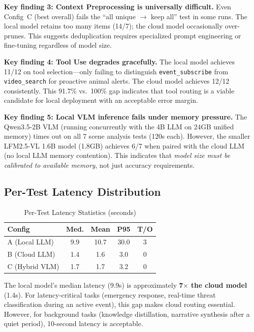 \documentclass[conference]{IEEEtran}
\begin{document}
\textbf{Key finding 3: Context Preprocessing is universally
difficult.} Even Config~C (best overall) fails the ``all unique
$\rightarrow$ keep all'' test in some runs. The local model retains too
many items (14/7); the cloud model occasionally over-prunes. This
suggests deduplication requires specialized prompt engineering or
fine-tuning regardless of model size.

\textbf{Key finding 4: Tool Use degrades gracefully.}
The local model achieves 11/12 on tool selection---only failing to
distinguish \texttt{event\_subscribe} from \texttt{video\_search} for
proactive animal alerts. The cloud model achieves 12/12 consistently.
This 91.7\% vs.\ 100\% gap indicates that tool routing is a viable
candidate for local deployment with an acceptable error margin.

\textbf{Key finding 5: Local VLM inference fails under memory pressure.}
The Qwen3.5-2B VLM (running concurrently with the 4B LLM on 24GB
unified memory) times out on all 7 scene analysis tests (120s each).
However, the smaller LFM2.5-VL 1.6B model (1.8GB) achieves 6/7 when
paired with the cloud LLM (no local LLM memory contention). This
indicates that \emph{model size must be calibrated to available
memory}, not just accuracy requirements.

\subsection{Per-Test Latency Distribution}

\begin{table}[h]
\centering
\caption{Per-Test Latency Statistics (seconds)}
\label{tab:latency}
\begin{tabular}{lcccc}
\toprule
\textbf{Config} & \textbf{Med.} & \textbf{Mean} & \textbf{P95} & \textbf{T/O} \\
\midrule
A (Local LLM) & 9.9 & 10.7 & 30.0 & 3 \\
B (Cloud LLM) & 1.4 & 1.6 & 3.0 & 0 \\
C (Hybrid VLM) & 1.7 & 1.7 & 3.2 & 0 \\
\bottomrule
\end{tabular}
\end{table}

The local model's median latency (9.9s) is approximately
\textbf{7$\times$ the cloud model} (1.4s). For latency-critical tasks
(emergency response, real-time threat classification during an active
event), this gap makes cloud routing essential. However, for background
tasks (knowledge distillation, narrative synthesis after a quiet period),
10-second latency is acceptable.
\end{document}
